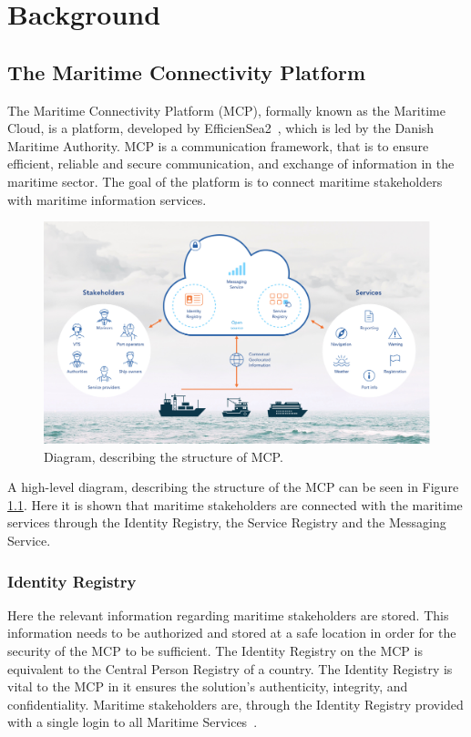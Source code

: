 \chapter{Background}

\section{The Maritime Connectivity Platform}
The Maritime Connectivity Platform (MCP), formally known as the Maritime Cloud, is a platform, developed by EfficienSea2~\cite{efficienSea2}, which is led by the Danish Maritime Authority. %
MCP is a communication framework, that is to ensure efficient, reliable and secure communication, and exchange of information in the maritime sector.
The goal of the platform is to connect maritime stakeholders with maritime information services.
\begin{figure}
	\includegraphics[width=1\textwidth]{figures/MCPStructure}
	\caption{Diagram, describing the structure of MCP\cite{efficienSea2}.}
	\label{fig:MCPStruct}
\end{figure}\noindent
A high-level diagram, describing the structure of the MCP can be seen in Figure \ref{fig:MCPStruct}. Here it is shown that maritime stakeholders are connected with the maritime services through the Identity Registry, the Service Registry and the Messaging Service.

\subsection{Identity Registry}
Here the relevant information regarding maritime stakeholders are stored. This information needs to be authorized and stored at a safe location in order for the security of the MCP to be sufficient. The Identity Registry on the MCP is equivalent to the Central Person Registry of a country. The Identity Registry is vital to the MCP in it ensures the solution's authenticity, integrity, and confidentiality. Maritime stakeholders are, through the Identity Registry provided with a single login to all Maritime Services~\cite{efficienSea2}.
